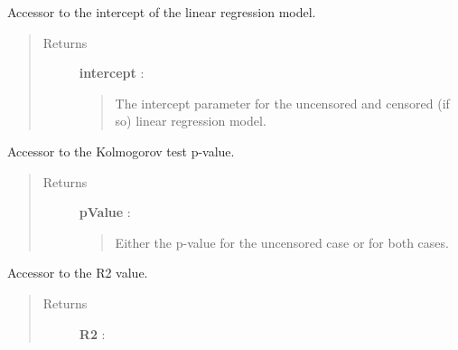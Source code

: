 \documentclass[letterpaper,10pt,english]{sphinxmanual}
\begin{document}
\begin{fulllineitems}
\begin{fulllineitems}
\label{_generated/otpod.UnivariateLinearModelAnalysis:otpod.UnivariateLinearModelAnalysis.getIntercept}
Accessor to the intercept of the linear regression model.
\begin{quote}\begin{description}
\item[{Returns}] \leavevmode
\textbf{intercept} : \href{http://doc.openturns.org/openturns-latest/sphinx/user\_manual/\_generated/openturns.NumericalPoint.html\#openturns.NumericalPoint}{}
\begin{quote}

The intercept parameter for the uncensored and censored (if so) linear
regression model.
\end{quote}

\end{description}\end{quote}

\end{fulllineitems}


\begin{fulllineitems}
\label{_generated/otpod.UnivariateLinearModelAnalysis:otpod.UnivariateLinearModelAnalysis.getKolmogorovPValue}
Accessor to the Kolmogorov test p-value.
\begin{quote}\begin{description}
\item[{Returns}] \leavevmode
\textbf{pValue} : \href{http://doc.openturns.org/openturns-latest/sphinx/user\_manual/\_generated/openturns.NumericalPoint.html\#openturns.NumericalPoint}{}
\begin{quote}

Either the p-value for the uncensored case or for both cases.
\end{quote}

\end{description}\end{quote}

\end{fulllineitems}


\begin{fulllineitems}
\label{_generated/otpod.UnivariateLinearModelAnalysis:otpod.UnivariateLinearModelAnalysis.getR2}
Accessor to the R2 value.
\begin{quote}\begin{description}
\item[{Returns}] \leavevmode
\textbf{R2} : \href{http://doc.openturns.org/openturns-latest/sphinx/user\_manual/\_generated/openturns.NumericalPoint.html\#openturns.NumericalPoint}{}
\begin{quote}


\end{quote}
\end{description}
\end{quote}
\end{fulllineitems}
\end{fulllineitems}
\end{document}
